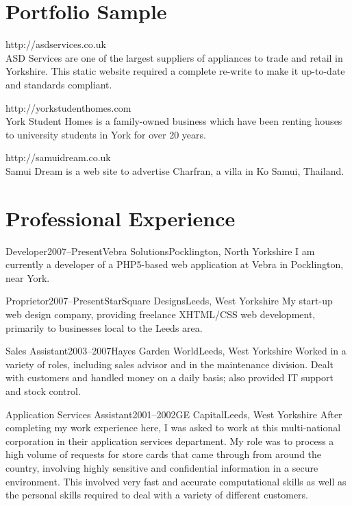 \documentclass{cv}
\begin{document}
\section{Portfolio Sample}

\begin{description}[style=nextline]
\item[ASD Services] http://asdservices.co.uk\\
ASD Services are one of the largest suppliers of appliances to trade and retail in Yorkshire. This static website required a complete re-write to make it up-to-date and standards compliant.
\item[York Student Homes] http://yorkstudenthomes.com\\
York Student Homes is a family-owned business which have been renting houses to university students in York for over 20 years.
\item[Samui Dream] http://samuidream.co.uk\\
Samui Dream is a web site to advertise Charfran, a villa in Ko Samui, Thailand.
\end{description}

\section{Professional Experience}

\begin{experience}{Developer}{2007--Present}{Vebra Solutions}{Pocklington, North Yorkshire}
I am currently a developer of a PHP5-based web application at Vebra in Pocklington, near York.
\end{experience}

\begin{experience}{Proprietor}{2007--Present}{StarSquare Designs}{Leeds, West Yorkshire}
My start-up web design company, providing freelance XHTML/CSS web development, primarily to businesses local to the Leeds area.
\end{experience}

\begin{experience}{Sales Assistant}{2003--2007}{Hayes Garden World}{Leeds, West Yorkshire}
Worked in a variety of roles, including sales advisor and in the maintenance division. Dealt with customers and handled money on a daily basis; also provided IT support and stock control.
\end{experience}

\begin{experience}{Application Services Assistant}{2001--2002}{GE Capital}{Leeds, West Yorkshire}
After completing my work experience here, I was asked to work at this multi-national corporation in their application services department. My role was to process a high volume of requests for store cards that came through from around the country, involving highly sensitive and confidential information in a secure environment. This involved very fast and accurate computational skills as well as the personal skills required to deal with a variety of different customers.
\end{experience}
\end{document}
